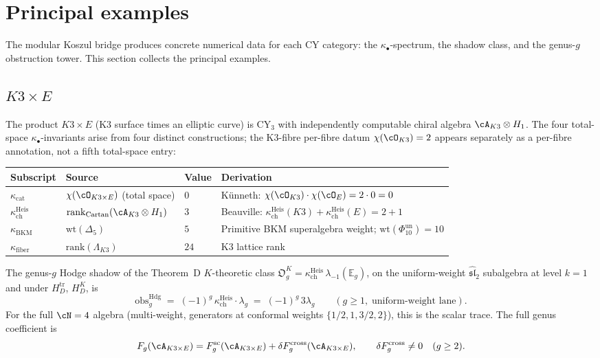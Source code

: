 \section{Principal examples}
\label{sec:cy-bridge-examples}

The modular Koszul bridge produces concrete numerical data for each CY category: the $\kappa_\bullet$-spectrum, the shadow class, and the genus-$g$ obstruction tower. This section collects the principal examples.

\subsection{\texorpdfstring{$K3 \times E$}{K3 x E}}
\label{subsec:k3xe-bridge-example}

The product $K3 \times E$ (K3 surface times an elliptic curve) is CY$_3$ with independently computable chiral algebra $\cA_{K3} \otimes H_1$. The four total-space $\kappa_\bullet$-invariants arise from four distinct constructions; the K3-fibre per-fibre datum $\chi(\cO_{K3}) = 2$ appears separately as a per-fibre annotation, not a fifth total-space entry:

\begin{center}
\begin{tabular}{llll}
 \textbf{Subscript} & \textbf{Source} & \textbf{Value} & \textbf{Derivation} \\
 \hline
 $\kappa_{\mathrm{cat}}$ & $\chi(\cO_{K3 \times E})$ (total space) & $0$ & K\"unneth: $\chi(\cO_{K3}) \cdot \chi(\cO_E) = 2 \cdot 0 = 0$ \\
 $\kappa_{\mathrm{ch}}^{\mathrm{Heis}}$ & $\mathrm{rank}_\mathrm{Cartan}(\cA_{K3} \otimes H_1)$ & $3$ & Beauville: $\kappa_{\mathrm{ch}}^{\mathrm{Heis}}(K3) + \kappa_{\mathrm{ch}}^{\mathrm{Heis}}(E) = 2 + 1$ \\
 $\kappa_{\mathrm{BKM}}$ & $\mathrm{wt}(\Delta_5)$ & $5$ & Primitive BKM superalgebra weight; $\mathrm{wt}(\Phi_{10}^{\mathrm{un}})=10$ \\
 $\kappa_{\mathrm{fiber}}$ & $\mathrm{rank}(\Lambda_{K3})$ & $24$ & K3 lattice rank \\
\end{tabular}
\end{center}

The genus-$g$ Hodge shadow of the Theorem~D $K$-theoretic class $\mathfrak O_g^K = \kappa_{\mathrm{ch}}^{\mathrm{Heis}}\,\lambda_{-1}(\mathbb E_g)$, on the uniform-weight $\widehat{\mathfrak{sl}}_2$ subalgebra at level $k = 1$ and under $H_D^{\mathrm{tr}}$, $H_D^K$, is
\[
 \mathrm{obs}_g^{\mathrm{Hdg}} \;=\; (-1)^g\,\kappa_{\mathrm{ch}}^{\mathrm{Heis}} \cdot \lambda_g \;=\; (-1)^g\,3\lambda_g
 \qquad (g \geq 1,\; \text{uniform-weight lane}).
\]
For the full $\cN = 4$ algebra (multi-weight, generators at conformal weights $\{1/2, 1, 3/2, 2\}$), this is the scalar trace.  The full genus coefficient is
\[
 F_g(\cA_{K3 \times E}) =
 F_g^{\mathrm{sc}}(\cA_{K3 \times E}) +
 \delta F_g^{\mathrm{cross}}(\cA_{K3 \times E}),
 \qquad
 \delta F_g^{\mathrm{cross}} \neq 0 \quad (g \geq 2).
\]

